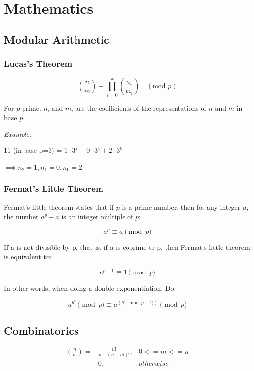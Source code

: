 \chapter{Mathematics}

\section{Modular Arithmetic}


	\subsection{Lucas's Theorem}

	$$ \binom{n}{m} \equiv \prod_{i=0}^k \binom{n_i}{m_i} \quad (\text{mod } p) $$ 

	For $p$ prime. $n_i$ and $m_i$ are the coefficients of the representations of $n$ and $m$ in base $p$.

	\textit{Example:}

		11 (in base p=3) = $1 \cdot 3^2 + 0 \cdot 3^1 + 2 \cdot 3^0$

		$\implies n_2 = 1, n_1 = 0, n_0 = 2$

	\subsection{Fermat's Little Theorem}

	Fermat's little theorem states that if $p$ is a prime number, then for any integer $a$, the number $a^p - a$ is an integer multiple of $p$:

	$$ a^{p} \equiv a {\pmod {p}} $$

	If a is not divisible by p, that is, if a is coprime to p, then Fermat's little theorem is equivalent to:

	$$ a^{p-1} \equiv 1 {\pmod {p}} $$

	In other words, when doing a double exponentiation. Do:

	$$ a^{b^c} {\pmod {p}} \equiv a^{ ({b^c} {\pmod {p-1}}) } {\pmod {p}} $$

\section{Combinatorics}

	\begin{align*}
		\binom{n}{m} =  & \frac{ n! }{ m! \cdot (n-m)! }, & 0 <= m <= n \\
						& 0, & otherwise
	\end{align*}

